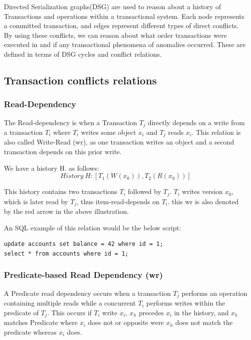 \documentclass[a4paper,10pt,titlepage]{report}
\begin{document}
Directed Serialization graphs(DSG) are used to reason about a history of Transactions and operations within a transactional system. Each node represents a committed transaction, and edges represent different types of direct conflicts. \\ By using these conflicts, we can reason about what order transactions were executed in and if any transactional phenomena of anomalies occurred. These are defined in terms of DSG cycles and conflict relations. 
\subsection{Transaction conflicts relations}
\subsubsection{Read-Dependency}

The Read-dependency is when a Transaction $T_j$ directly depends on a write from a transaction $T_i$ where $T_i$ writes some object $x_i$ and $T_j$ reads $x_i$. This relation is also called Write-Read (wr), as one transaction writes an object and a second transaction depends on this prior write.
        
\vspace{2mm}

\vspace{2mm}

We have a history H. as follows:
\begin{equation}
    History\ H: [T_1(W(x_0)), T_2(R(x_0))]
\end{equation}

This history contains two transactions $T_i$ followed by $T_j$. $T_i$ writes version $x_0$, which is later read by $T_j$, thus item-read-depends on $T_i$. this wr is also denoted by the red arrow in the above illustration.
    
An SQL example of this relation would be the below script:
        
\begin{lstlisting}
update accounts set balance = 42 where id = 1;
select * from accounts where id = 1;
\end{lstlisting}
        
        
\subsubsection{Predicate-based Read Dependency (wr)}
A Predicate read dependency occurs when a transaction $T_j$ performs an operation containing multiple reads while a concurrent $T_i$ performs writes within the predicate of $T_j$. This occurs if $T_i$ write $x_i$, $x_h$ precedes $x_i$ in the history, and $x_h$ matches Predicate where $x_i$ does not or opposite were $x_h$ does not match the predicate whereas $x_i$ does.\\
\end{document}
